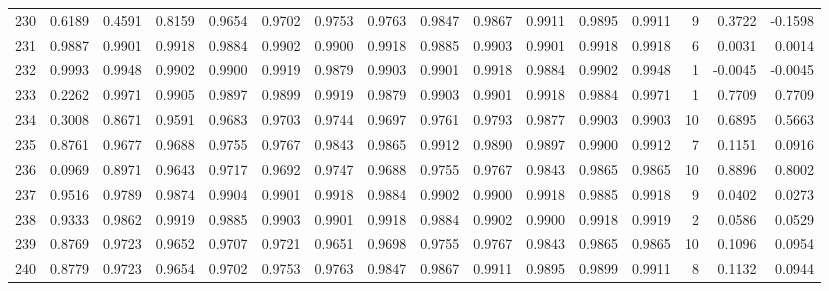 \begin{tabular}{lrrrrrrrrrrrrrrr}
230 &      0.6189 &  0.4591 &  0.8159 &  0.9654 &  0.9702 &  0.9753 &  0.9763 &  0.9847 &  0.9867 &  0.9911 &   0.9895 &     0.9911 &      9 &                    0.3722 &                    -0.1598 \\
231 &      0.9887 &  0.9901 &  0.9918 &  0.9884 &  0.9902 &  0.9900 &  0.9918 &  0.9885 &  0.9903 &  0.9901 &   0.9918 &     0.9918 &      6 &                    0.0031 &                     0.0014 \\
232 &      0.9993 &  0.9948 &  0.9902 &  0.9900 &  0.9919 &  0.9879 &  0.9903 &  0.9901 &  0.9918 &  0.9884 &   0.9902 &     0.9948 &      1 &                   -0.0045 &                    -0.0045 \\
233 &      0.2262 &  0.9971 &  0.9905 &  0.9897 &  0.9899 &  0.9919 &  0.9879 &  0.9903 &  0.9901 &  0.9918 &   0.9884 &     0.9971 &      1 &                    0.7709 &                     0.7709 \\
234 &      0.3008 &  0.8671 &  0.9591 &  0.9683 &  0.9703 &  0.9744 &  0.9697 &  0.9761 &  0.9793 &  0.9877 &   0.9903 &     0.9903 &     10 &                    0.6895 &                     0.5663 \\
235 &      0.8761 &  0.9677 &  0.9688 &  0.9755 &  0.9767 &  0.9843 &  0.9865 &  0.9912 &  0.9890 &  0.9897 &   0.9900 &     0.9912 &      7 &                    0.1151 &                     0.0916 \\
236 &      0.0969 &  0.8971 &  0.9643 &  0.9717 &  0.9692 &  0.9747 &  0.9688 &  0.9755 &  0.9767 &  0.9843 &   0.9865 &     0.9865 &     10 &                    0.8896 &                     0.8002 \\
237 &      0.9516 &  0.9789 &  0.9874 &  0.9904 &  0.9901 &  0.9918 &  0.9884 &  0.9902 &  0.9900 &  0.9918 &   0.9885 &     0.9918 &      9 &                    0.0402 &                     0.0273 \\
238 &      0.9333 &  0.9862 &  0.9919 &  0.9885 &  0.9903 &  0.9901 &  0.9918 &  0.9884 &  0.9902 &  0.9900 &   0.9918 &     0.9919 &      2 &                    0.0586 &                     0.0529 \\
239 &      0.8769 &  0.9723 &  0.9652 &  0.9707 &  0.9721 &  0.9651 &  0.9698 &  0.9755 &  0.9767 &  0.9843 &   0.9865 &     0.9865 &     10 &                    0.1096 &                     0.0954 \\
240 &      0.8779 &  0.9723 &  0.9654 &  0.9702 &  0.9753 &  0.9763 &  0.9847 &  0.9867 &  0.9911 &  0.9895 &   0.9899 &     0.9911 &      8 &                    0.1132 &                     0.0944 \\

\end{tabular}
